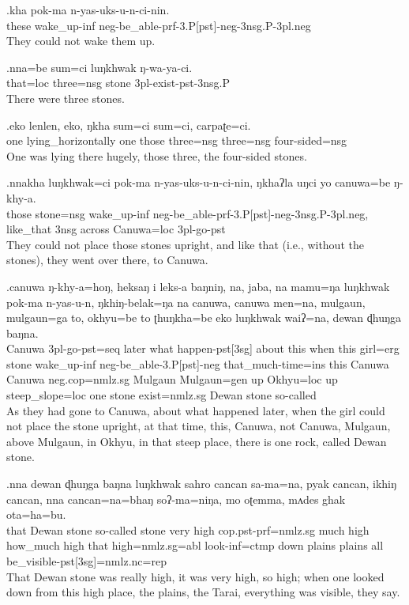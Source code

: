 \exg.kha pok-ma  n-yas-uks-u-n-ci-nin.\\
these wake\_up{\sc -inf}   {\sc neg-}be\_able{\sc -prf-3.P[pst]-neg-3nsg.P-3pl.neg}\\
They could not wake them up.

\exg.nna=be sum=ci luŋkhwak ŋ-wa-ya-ci.\\
that{\sc =loc} three{\sc =nsg} stone {\sc 3pl-}exist{\sc -pst-3nsg.P}\\
There were three stones.

\exg.eko lenlen,   eko, ŋkha sum=ci sum=ci, carpaʈe=ci.\\
one lying\_horizontally one those three{\sc =nsg} three{\sc =nsg} four-sided{\sc =nsg}\\
One was lying there hugely, those three, the four-sided stones.

\exg.nnakha luŋkhwak=ci  pok-ma  n-yas-uks-u-n-ci-nin,     ŋkhaʔla uŋci yo canuwa=be ŋ-khy-a.\\
those  stone{\sc =nsg} wake\_up{\sc -inf} {\sc neg-}be\_able{\sc -prf-3.P[pst]-neg-3nsg.P-3pl.neg}, like\_that {\sc 3nsg}  across  Canuwa{\sc =loc} {\sc 3pl-}go{\sc -pst}\\
They could not place those stones upright, and like that (i.e., without the stones), they went over there, to Canuwa.

\exg.canuwa  ŋ-khy-a=hoŋ,  heksaŋ i  leks-a  baŋniŋ, na, jaba, na mamu=ŋa luŋkhwak pok-ma  n-yas-u-n, ŋkhiŋ-belak=ŋa na canuwa,  canuwa  men=na, mulgaun, mulgaun=ga  to, okhyu=be  to  ʈhuŋkha=be  eko luŋkhwak waiʔ=na,   dewan  ɖhuŋga baŋna.\\
Canuwa {\sc 3pl-}go{\sc -pst=seq}  later what happen{\sc -pst[3sg]} about this when this girl{\sc =erg} stone wake\_up{\sc -inf} {\sc neg-}be\_able{\sc -3.P[pst]-neg} that\_much-time{\sc =ins} this Canuwa Canuwa {\sc neg.cop=nmlz.sg} Mulgaun Mulgaun{\sc =gen} up Okhyu{\sc =loc} up  steep\_slope{\sc =loc} one stone exist{\sc [3sg]=nmlz.sg} Dewan stone  so-called\\
As they had gone to Canuwa, about what happened later, when the girl could not place the stone upright, at that time, this, Canuwa, not Canuwa, Mulgaun, above Mulgaun, in Okhyu, in that steep place, there is one rock, called Dewan stone.

\exg.nna  dewan  ɖhuŋga baŋna  luŋkhwak sahro cancan sa-ma=na,  pyak cancan, ikhiŋ cancan, nna  cancan=na=bhaŋ  soʔ-ma=niŋa,  mo oʈemma, mʌdes ghak ota=ha=bu.\\
that Dewan stone  so-called stone very  high {\sc cop.pst-prf=nmlz.sg} much high how\_much high that high{\sc =nmlz.sg=abl} look{\sc -inf=ctmp} down plains  plains all  be\_visible{\sc -pst[3sg]=nmlz.nc=rep}\\
That Dewan stone was really high, it was very high, so high; when one looked down from this high place, the
plains, the Tarai, everything was visible, they say.

